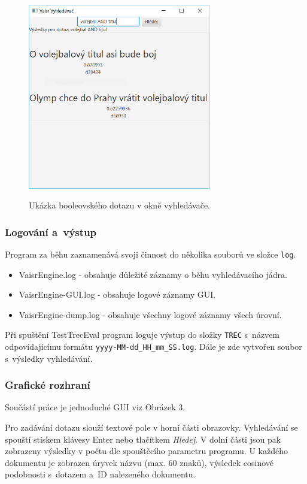 \documentclass[12pt, a4paper]{article}
\begin{document}
\begin{figure}[ht!]
\centering
\includegraphics[bb= 0 0 584 592 , width=80mm]{gui.png}
\label{fig:gui}
\caption{Ukázka booleovského dotazu v okně vyhledávače.}
\end{figure}

\subsubsection{Logování a~výstup}

Program za běhu zaznamenává svoji činnost do několika souborů ve složce \texttt{log}. 
\begin{itemize}
\item VaisrEngine.log - obsahuje důležité záznamy o běhu vyhledávacího jádra.
\item VaisrEngine-GUI.log - obsahuje logové záznamy GUI.
\item VaisrEngine-dump.log - obsahuje všechny logové záznamy všech úrovní.
\end{itemize}

Při spuštění TestTrecEval program loguje výstup do složky \texttt{TREC} s~názvem odpovídajícímu formátu \texttt{yyyy-MM-dd\_HH\_mm\_SS.log}. Dále je zde vytvořen soubor s~výsledky vyhledávání.


\subsubsection{Grafické rozhraní}

Součástí práce je jednoduché GUI viz Obrázek 3.

Pro zadávání dotazu slouží textové pole v horní části obrazovky. Vyhledávání se spouští stiskem klávesy Enter nebo tlačítkem \emph{Hledej}. V dolní části jsou pak zobrazeny výsledky v počtu dle spouštěcího parametru programu. U každého dokumentu je zobrazen úryvek názvu (max. 60 znaků), výsledek cosinové podobnosti s~dotazem a~ID nalezeného dokumentu.
\end{document}

